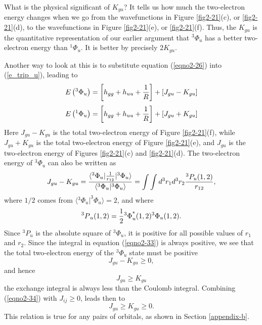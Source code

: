 What is the physical significant of $K_{gu}$? It tells us how much the
two-electron energy changes when we go from the wavefunctions in
Figure \ref{fig2-21}(c), or \ref{fig2-21}(d), to the wavefunctions in
Figure \ref{fig2-21}(e), or \ref{fig2-21}(f). Thus, the $K_{gu}$ is
the quantitative representation of our earlier argument that
$^3\Phi_u$ has a better two-electron energy than $^1\Phi_u$. It is
better by precisely $2K_{gu}$.

Another way to look at this is to substitute equation (\ref{eqno2-26})
into (\ref{e_trip_u}), leading to
\begin{equation}
E \left(^3\Phi_u\right) = \left[ h_{gg} + h_{uu} + {1 \over R} 
\right] + \left[ J_{gu} - K_{gu}\right]
\end{equation}
\begin{equation}
E \left(^1\Phi_u\right) = \left[ h_{gg} + h_{uu} + {1 \over R} 
\right] + \left[ J_{gu} + K_{gu}\right]
\end{equation}
Here $J_{gu} - K_{gu}$ is the total two-electron energy of Figure
\ref{fig2-21}(f), while $J_{gu} + K_{gu}$ is the total two-electron
energy of Figure \ref{fig2-21}(e), and $J_{gu}$ is the two-electron
energy of Figures \ref{fig2-21}(c) and \ref{fig2-21}(d). The
two-electron energy of $^3\Phi_u$ can also be written as
\begin{equation}
J_{gu} - K_{gu} = {\langle {^3\Phi}_u \vert {1 \over r_{12}} \vert
{^3\Phi}_u \rangle \over  \langle {^3\Phi}_u \vert {^3\Phi}_u 
\rangle} = \int \int d^3 r_1 d^3 r_2 {^3P_u(1,2) \over 
r_{12}},
\label{eqno2-33}
\end{equation}
where $1/2$ comes from $\langle {^3\Phi}_u \vert^3\Phi_u \rangle = 2$,
and where
\begin{equation}
{^3P}_u ( 1 , 2 ) = {1 \over 2} {^3\Phi}_u^* ( 1 , 2 ) ^3\Phi_u(1,2).
\end{equation}
Since ${^3P}_u$ is the absolute square of ${^3\Phi}_u$, it is
positive for all possible values of $r_1$ and $r_2$.  Since the
integral in equation (\ref{eqno2-33}) is always positive, we see that
the total two-electron energy of the ${^3\Phi}_u$ state must be
positive
\begin{equation}
J_{gu} - K_{gu} \geq 0,
\end{equation}
and hence
\begin{equation}
J_{gu} \geq K_{gu}
\label{eqno2-34}
\end{equation}
the exchange integral is always less than the Coulomb
integral. Combining (\ref{eqno2-34}) with $J_{ij} \geq 0$, leads then
to
\begin{equation}
J_{gu} \geq K_{gu} \geq 0.
\end{equation}
This relation is true for any pairs of orbitals, as shown in Section
\ref{appendix-b}. 

